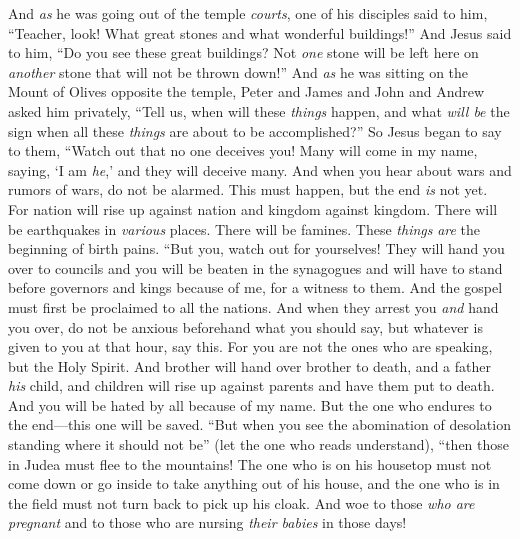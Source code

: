 \begin{biblechapter} %
 And \textit{as} he was going out of the temple \textit{courts}, one of his disciples said to him, “Teacher, look! What great stones and what wonderful buildings!”
\verse And Jesus said to him, “Do you see these great buildings? Not \textit{one} stone will be left here on \textit{another} stone that will not be thrown down!”
 And \textit{as} he was sitting on the Mount of Olives opposite the temple, Peter and James and John and Andrew asked him privately,
\verse “Tell us, when will these \textit{things} happen, and what \textit{will be} the sign when all these \textit{things} are about to be accomplished?”
\verse So Jesus began to say to them, “Watch out that no one deceives you!
\verse Many will come in my name, saying, ‘I am \textit{he},’ and they will deceive many.
\verse And when you hear about wars and rumors of wars, do not be alarmed. This must happen, but the end \textit{is} not yet.
\verse For nation will rise up against nation and kingdom against kingdom. There will be earthquakes in \textit{various} places. There will be famines. These \textit{things} \textit{are} the beginning of birth pains.
 “But you, watch out for yourselves! They will hand you over to councils and you will be beaten in the synagogues and will have to stand before governors and kings because of me, for a witness to them.
\verse And the gospel must first be proclaimed to all the nations.
\verse And when they arrest you \textit{and} hand you over, do not be anxious beforehand what you should say, but whatever is given to you at that hour, say this. For you are not the ones who are speaking, but the Holy Spirit.
\verse And brother will hand over brother to death, and a father \textit{his} child, and children will rise up against parents and have them put to death.
\verse And you will be hated by all because of my name. But the one who endures to the end—this one will be saved.
 “But when you see the abomination of desolation standing where it should not be” (let the one who reads understand), “then those in Judea must flee to the mountains!
\verse The one who is on his housetop must not come down or go inside to take anything out of his house,
\verse and the one who is in the field must not turn back to pick up his cloak.
\verse And woe to those \textit{who are pregnant} and to those who are nursing \textit{their babies} in those days!

\end{biblechapter}
